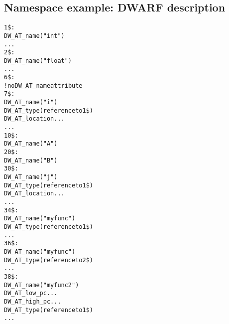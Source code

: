 \subsection{Namespace example: DWARF description}
\label{app:namespaceexampledwarfdescription}
\begin{alltt}

1\$:  
        DW\-\_AT\-\_name("int")
        ...
2\$:  
        DW\-\_AT\-\_name("float")
        ...
6\$:  
        ! no DW\-\_AT\-\_name attribute
7\$:
            DW\-\_AT\-\_name("i")
            DW\-\_AT\-\_type(reference to 1\$)
            DW\-\_AT\-\_location ...
            ...
10\$: 
        DW\-\_AT\-\_name("A")
20\$:    
            DW\-\_AT\-\_name("B")
30\$:        
                DW\-\_AT\-\_name("j")
                DW\-\_AT\-\_type(reference to 1\$)
                DW\-\_AT\-\_location ...
                ...
34\$:        
                DW\-\_AT\-\_name("myfunc")
                DW\-\_AT\-\_type(reference to 1\$)
                ...
36\$:        
                DW\-\_AT\-\_name("myfunc")
                DW\-\_AT\-\_type(reference to 2\$)
                ...
38\$:        
                DW\-\_AT\-\_name("myfunc2")
                DW\-\_AT\-\_low\-\_pc ...
                DW\-\_AT\-\_high\-\_pc ...
                DW\-\_AT\-\_type(reference to 1\$)
                ...


\end{alltt}
